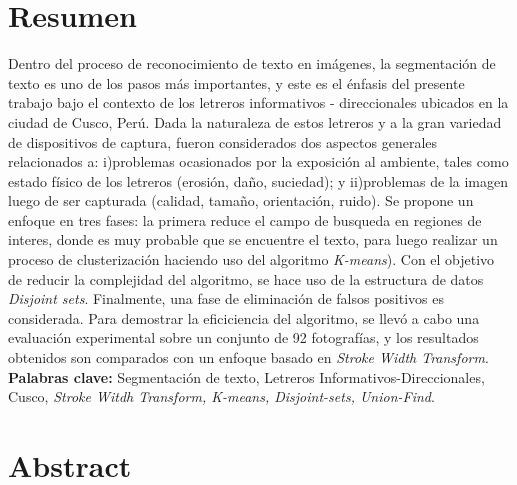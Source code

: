 \documentclass[12pt,oneside,a4paper]{book}
\theoremstyle{definition}
\begin{document}

\chapter*{Resumen}

Dentro del proceso de reconocimiento de texto en imágenes, la segmentación de 
texto es uno de los pasos más importantes, y este es el énfasis del presente
trabajo bajo el contexto de los letreros informativos - direccionales ubicados 
en la ciudad de Cusco, Perú. Dada la naturaleza de estos letreros y a la gran
variedad de dispositivos de captura, fueron considerados dos aspectos generales
relacionados a: i)problemas ocasionados por la exposición al ambiente, tales como 
estado físico de los letreros (erosión, daño, suciedad); y ii)problemas de la 
imagen luego de ser capturada (calidad, tamaño, orientación, ruido). Se propone 
un enfoque en tres fases: la primera reduce el campo de busqueda en regiones de interes, 
donde es muy probable que se encuentre el texto, para luego realizar un proceso
de clusterización haciendo uso del algoritmo \textit{K-means}). Con el objetivo
de reducir la complejidad del algoritmo, se hace uso de la estructura de datos 
\textit{Disjoint sets}. Finalmente, una fase de eliminación de falsos positivos 
es considerada. Para demostrar la eficiciencia del algoritmo, se llevó a cabo
una evaluación experimental sobre un conjunto de 92 fotografías, y los 
resultados obtenidos son comparados con un enfoque basado en 
\textit{Stroke Width Transform}.
\\

\noindent \textbf{Palabras clave:} Segmentación de texto, Letreros Informativos-Direccionales, 
Cusco, \textit{Stroke Witdh Transform, K-means, Disjoint-sets, Union-Find}.

\chapter*{Abstract}
\end{document}
